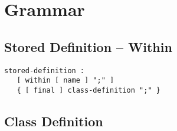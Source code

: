 \section{Grammar}\label{grammar}

\subsection{Stored Definition -- Within}\label{stored-definition-within}

\begin{lstlisting}[language=grammar]
stored-definition :
   [ within [ name ] ";" ]
   { [ final ] class-definition ";" }
\end{lstlisting}

\subsection{Class Definition}\label{class-definition}


